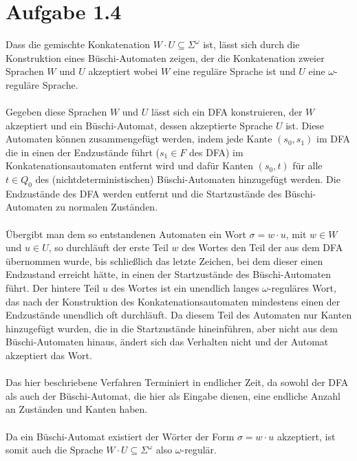 \documentclass[12pt, paper=a4]{article}
\begin{document}
\section*{Aufgabe 1.4}
Dass die gemischte Konkatenation $W \cdot U \subseteq \Sigma^\omega$ ist, lässt sich durch die Konstruktion eines Büschi-Automaten zeigen, der die Konkatenation zweier Sprachen $W$ und $U$ akzeptiert wobei $W$ eine reguläre Sprache ist und $U$ eine $\omega$-reguläre Sprache.\\
\\
Gegeben diese Sprachen $W$ und $U$ lässt sich ein DFA konstruieren, der $W$ akzeptiert und ein Büschi-Automat, dessen akzeptierte Sprache $U$ ist. Diese Automaten können zusammengefügt werden, indem jede Kante $(s_0, s_1)$ im DFA die in einen der Endzustände führt ($s_1 \in F$ des DFA) im Konkatenationsautomaten entfernt wird und dafür Kanten $(s_0, t)$ für alle $t \in Q_0$ des (nichtdeterministischen) Büschi-Automaten hinzugefügt werden. Die Endzustände des DFA werden entfernt und die Startzustände des Büschi-Automaten zu normalen Zuständen.\\
\\
Übergibt man dem so entstandenen Automaten ein Wort $\sigma = w \cdot u$, mit $w \in W$ und $u \in U$, so durchläuft der erste Teil $w$ des Wortes den Teil der aus dem DFA übernommen wurde, bis schließlich das letzte Zeichen, bei dem dieser einen Endzustand erreicht hätte, in einen der Startzustände des Büschi-Automaten führt. Der hintere Teil $u$ des Wortes ist ein unendlich langes $\omega$-reguläres Wort, das nach der Konstruktion des Konkatenationsautomaten mindestens einen der Endzustände unendlich oft durchläuft. Da diesem Teil des Automaten nur Kanten hinzugefügt wurden, die in die Startzustände hineinführen, aber nicht aus dem Büschi-Automaten hinaus, ändert sich das Verhalten nicht und der Automat akzeptiert das Wort.\\
\\
Das hier beschriebene Verfahren Terminiert in endlicher Zeit, da sowohl der DFA als auch der Büschi-Automat, die hier als Eingabe dienen, eine endliche Anzahl an Zuständen und Kanten haben.\\
\\
Da ein Büschi-Automat existiert der Wörter der Form $\sigma = w \cdot u$ akzeptiert, ist somit auch die Sprache $W \cdot U \subseteq \Sigma^\omega$ also $\omega$-regulär.\\
\end{document}

